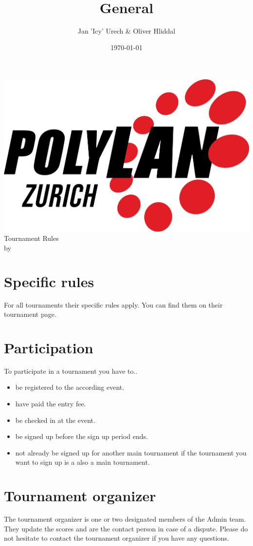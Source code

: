 \documentclass{article}
\title{General }
\author{Jan 'Icy' Urech \& Oliver Hliddal}
\date{\today}
\begin{document}
\makeatletter
\begin{titlepage}
\centering
\includegraphics[scale=0.1]{img/PolyLAN_Zurich_black.png}\\
\LARGE \@title  Tournament Rules\\ \normalsize by \@author\\ \@date
\end{titlepage}
\makeatother


\clearpage

\tableofcontents
\clearpage


\section{Specific rules}
For all tournaments their specific rules apply. You can find them on their tournament page.



\section{Participation} 
To participate in a tournament you have to..
\begin{itemize}
	\item be registered to the according event.
	\item have paid the entry fee.
	\item be checked in at the event.
	\item be signed up before the sign up period ends.
	\item not already be signed up for another main tournament if the tournament you want to sign up is a also a main tournament.
\end{itemize}

\section{Tournament organizer}
The tournament organizer is one or two designated members of the Admin team. They update the scores and are the contact person in case of a dispute. Please do not hesitate to contact the tournament organizer if you have any questions.
\end{document}
